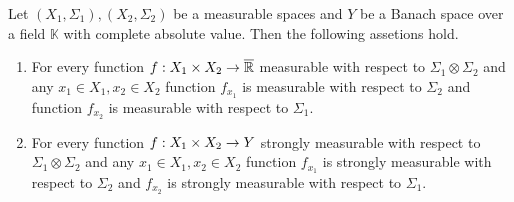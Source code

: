 \begin{proposition}\label{proposition:sectionsoftensorsigmaalgebra}
Let $(X_1,\Sigma_1), (X_2,\Sigma_2)$ be a measurable spaces and $Y$ be a Banach space over a field $\mathbb{K}$ with complete absolute value. Then the following assetions hold.
\begin{enumerate}[label=\emph{\textbf{(\arabic*)}}, leftmargin=*]
\item For every function $f:X_1\times X_2\rightarrow \overline{{\mathbb R}}$ measurable with respect to $\Sigma_1\otimes \Sigma_2$ and any $x_1\in X_1,x_2\in X_2$ function $f_{x_1}$ is measurable with respect to $\Sigma_2$ and function $f_{x_2}$ is measurable with respect to $\Sigma_1$.
\item For every function $f:X_1\times X_2\rightarrow Y$ strongly measurable with respect to $\Sigma_1\otimes \Sigma_2$ and any $x_1\in X_1,x_2\in X_2$ function $f_{x_1}$ is strongly measurable with respect to $\Sigma_2$ and $f_{x_2}$ is strongly measurable with respect to $\Sigma_1$.
\end{enumerate}
\end{proposition}
